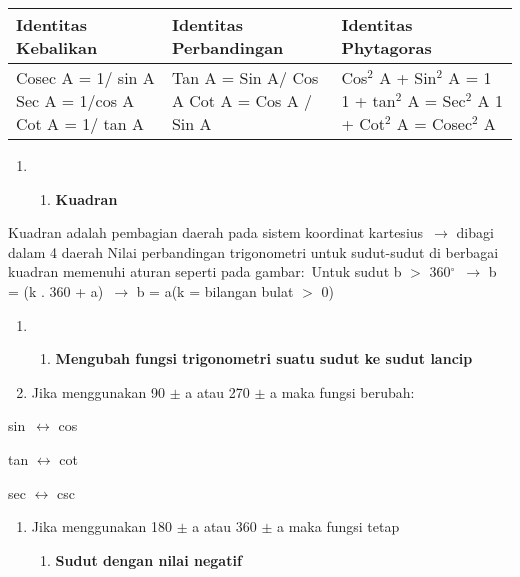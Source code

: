 \documentclass[11pt,fleqn]{book} %
\begin{document}
\begin{myEnumerate}
\begin{itemize}
\begin{tabular}{|p{1.8in}|p{1.9in}|p{1.8in}|} \hline 
Identitas Kebalikan & Identitas Perbandingan & Identitas Phytagoras \\ \hline 
Cosec A = 1/ sin A Sec A = 1/cos A Cot A = 1/ tan A & Tan A = Sin A/ Cos A Cot A = Cos A / Sin A  & Cos${}^{2}$ A + Sin${}^{2}$ A = 1 1 + tan${}^{2}$ A = Sec${}^{2}$ A 1 + Cot${}^{2}$ A = Cosec${}^{2}$ A \\ \hline 
\end{tabular}

\textbf{}

\begin{enumerate}
\item \begin{enumerate}
\item \textbf{ Kuadran}
\end{enumerate}
\end{enumerate}

Kuadran adalah pembagian daerah pada sistem koordinat kartesius~$\mathrm{\to}$ dibagi dalam 4 daerah Nilai perbandingan trigonometri untuk sudut-sudut di berbagai kuadran memenuhi aturan seperti pada gambar:~Untuk sudut b $>$ 360${}^\circ$~$\mathrm{\to}$ b = (k . 360 + a)~$\mathrm{\to}$ b = a(k = bilangan bulat $>$ 0)\textbf{}

\begin{enumerate}
\item \begin{enumerate}
\item \textbf{ Mengubah fungsi trigonometri suatu sudut ke sudut lancip}
\end{enumerate}

\item  Jika menggunakan 90 $\pm$ a atau 270 $\pm$ a maka fungsi berubah:
\end{enumerate}

\noindent sin~$\mathrm{\leftrightarrow}$ cos

\noindent tan $\mathrm{\leftrightarrow}$ cot

\noindent sec $\mathrm{\leftrightarrow}$ csc

\begin{enumerate}
\item  Jika menggunakan 180 $\pm$ a atau 360 $\pm$ a maka fungsi tetap

\begin{enumerate}
\item  \textbf{Sudut dengan nilai negatif}
\end{enumerate}
\end{enumerate}


\end{itemize}
\end{myEnumerate}
\end{document}
